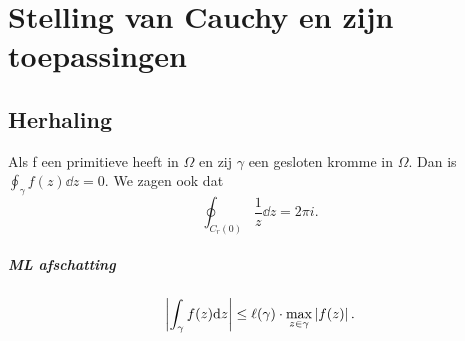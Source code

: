 
\chapter{Stelling van Cauchy en zijn toepassingen} \label{chap:stelling_vann_cauchy_en_zijn_toepassingen}
\setcounter{section}{-1}
\section{Herhaling} \label{sec:herhaling}


Als f een primitieve heeft in $\Omega$ en zij $\gamma$ een gesloten kromme in $\Omega$. Dan is $\oint_\gamma f(z) \dd z = 0$.
We zagen ook dat \[
	\oint_{C_r(0)} \frac{1}{z} \dd z = {2\pi i}
.\] 
\paragraph{ML afschatting}

\[
	\left| 	\int_\gamma f(z) \mathrm{d} z  \right| \le \ell(\gamma)\cdot \max_{z \in \gamma} \left| f(z) \right|
.\] 

